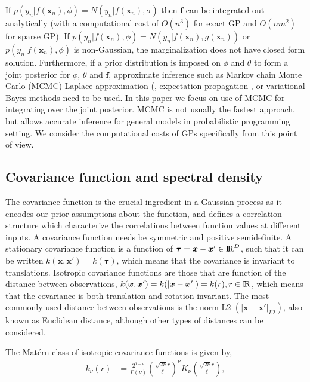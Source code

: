 \documentclass[]{interact}
\theoremstyle{plain}%
\theoremstyle{definition}
\theoremstyle{remark}
\begin{document}
If $p(y_n|f(\bm{x}_n),\phi)=N(y_n|f(\bm{x}_n),\sigma)$ then $\bm{f}$ can be integrated out analytically (with a computational cost of $O(n^3)$ for exact GP and $O(nm^2)$ for sparse GP). If $p(y_n|f(\bm{x}_n),\phi)=N(y_n|f(\bm{x}_n),g(\bm{x}_n))$ or $p(y_n|f(\bm{x}_n),\phi)$ is non-Gaussian, the marginalization does not have closed form solution.
%
Furthermore, if a prior distribution is imposed on $\phi$ and $\theta$ to form a joint posterior for $\phi$, $\theta$ and $\bm{f}$,
approximate inference such as Markov chain Monte Carlo (MCMC) \citep{brooks_2011} Laplace approximation (\citep{williams1998bayesian,rasmussen2006gaussian}, expectation propagation \citep{minka2001expectation}, or variational Bayes methods \citep{gibbs2000variational,csato2000efficient} need to be used.
%
In this paper we focus on use of MCMC for integrating over the joint
posterior. MCMC is not usually the fastest approach, but allows
accurate inference for general models in probabilistic programming
setting. We consider the computational costs of GPs specifically from
this point of view.

\subsection{Covariance function and spectral density}

The covariance function is the crucial ingredient in a Gaussian process as it encodes our prior assumptions about the function, and defines a correlation structure which characterize the correlations between function values at different inputs. A covariance function needs be symmetric and positive semidefinite. A stationary covariance function is a function of $\bm{\tau}=\bm{x}-\bm{x}' \in {\rm I\!R}^D$, such that it can be written $k(\bm{x},\bm{x}') = k(\bm{\tau})$, which means that the covariance is invariant to translations. Isotropic covariance functions are those that are function of the distance between observations, $k(\bm{x},\bm{x}') = k(|\bm{x}-\bm{x}'|) = k(r), r\in {\rm I\!R}$, which means that the covariance is both translation and rotation invariant. The most commonly used distance between observations is the norm L2 $(|\bm{x}-\bm{x}'|_{L2})$, also known as Euclidean distance, although other types of distances can be considered. 

The Mat\'ern class of isotropic covariance functions is given by, 
%
\begin{align*}
k_{\nu}(r)&=\frac{2^{1-\nu}}{\Gamma(\nu)}\left(\frac{\sqrt{2\nu}r}{\ell}\right)^{\nu}K_{\nu}\left(\frac{\sqrt{2\nu}r}{\ell}\right),
\end{align*}
\end{document}
